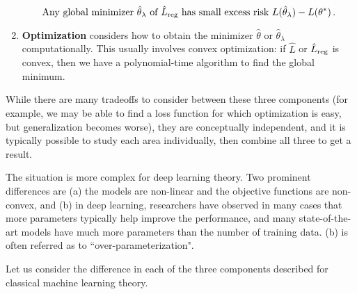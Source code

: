 \begin{enumerate}
\begin{equation}\label{lec9:eqn:classical-guarantee}
\text{Any global minimizer }\hat{\theta}_\lambda \text{ of } \hat{L}_{\textup{reg}} \textup{ has small excess risk }  L(\hat{\theta}_\lambda) - L(\theta^*)\,.
\end{equation}

\item {\bf Optimization} considers how to obtain the minimizer $\hat\theta$ or $\hat{\theta}_\lambda$ computationally. This usually involves convex optimization: if $\hat{L}$ or $\hat{L}_{\textup{reg}}$ is convex, then we have a polynomial-time algorithm to find the global minimum.
\end{enumerate}

While there are many tradeoffs to consider between these three components (for example, we may be able to find a loss function for which optimization is easy, but generalization becomes worse), they are conceptually independent, and it is typically possible to study each area individually, then combine all three to get a result.

The situation is more complex for deep learning theory. Two prominent differences are (a) the models are non-linear and the objective functions are non-convex, and (b) in deep learning, researchers have observed in many cases that more parameters typically help improve the performance, and many state-of-the-art models have much more parameters than the number of training data. (b) is often referred as to ``over-parameterization". 

Let us consider the difference in each of the three components described for classical machine learning theory. 

